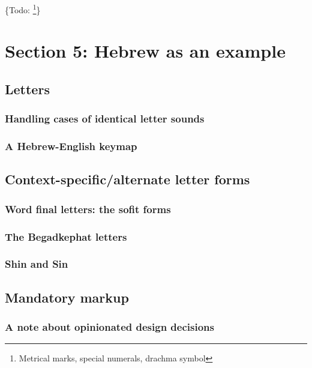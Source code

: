 \documentclass[11pt]{article}
\begin{document}
\{Todo: \footnote{Metrical marks, special numerals, drachma symbol}\}

\section{Section 5: Hebrew as an example}
\label{sec:orge678579}

\subsection{Letters}
\label{sec:org0c5368b}

\subsubsection{Handling cases of identical letter sounds}
\label{sec:org65ef786}

\subsubsection{A Hebrew-English keymap}
\label{sec:org04d1328}

\subsection{Context-specific/alternate letter forms}
\label{sec:org8138ef7}

\subsubsection{Word final letters: the sofit forms}
\label{sec:org82be3d6}

\subsubsection{The Begadkephat letters}
\label{sec:org6e83d9c}

\subsubsection{Shin and Sin}
\label{sec:org62094d9}

\subsection{Mandatory markup}
\label{sec:org95bd950}

\subsubsection{A note about opinionated design decisions}
\label{sec:org49ce564}
\end{document}

